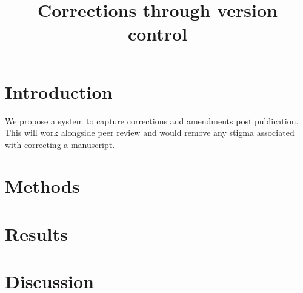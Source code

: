 \documentclass{article}
\begin{document}
\title{Corrections through version control}
\begin{titlepage}
\maketitle
\end{titlepage}






\section{Introduction}
We propose a system to capture corrections and amendments post publication. This will work alongside peer review and would remove any stigma associated with correcting a manuscript. 

\vspace{5mm}

\section{Methods}

\vspace{5mm}

\section{Results}

\vspace{5mm}

\section{Discussion}
\end{document}
